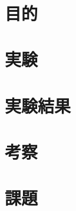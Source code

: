 \documentclass[uplatex, 11pt,a4j, titlepage]{jsarticle}
\begin{document}

\newpage




\newpage
\ 
\newpage


\section{目的}
\section{実験}
\section{実験結果}
\section{考察}
\section{課題}


\newpage
\thispagestyle{empty}
\nocite{Material}


\end{document}
